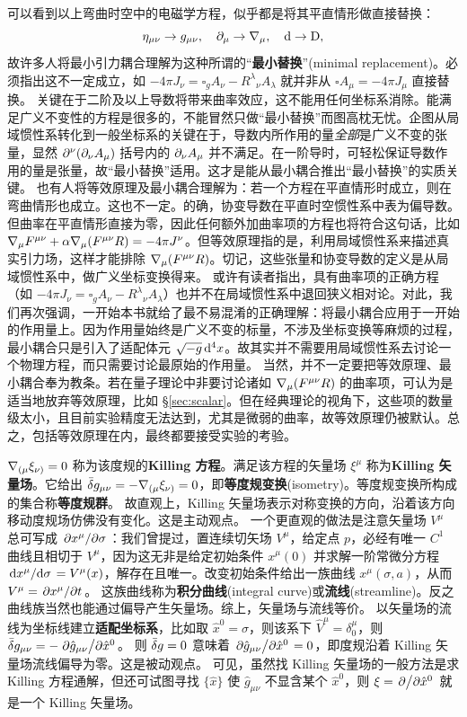 可以看到以上弯曲时空中的电磁学方程，似乎都是将其平直情形做直接替换：
\[
    \eta_{\mu\nu}\to g_{\mu\nu},\quad\p_\mu\to\cd_\mu,\quad\d\to\D,
\]
故许多人将最小引力耦合理解为这种所谓的“\textbf{最小替换}”(minimal replacement)。必须指出这不一定成立，如 $-4\pi J_\nu=\square_g A_\nu- R^\lambda{}_{\nu} A_\lambda$ 就并非从 $\square A_\mu =-4\pi J_\mu$ 直接替换。
关键在于二阶及以上导数将带来曲率效应，这不能用任何坐标系消除。能满足广义不变性的方程是很多的，不能冒然只做“最小替换”而图高枕无忧。企图从局域惯性系转化到一般坐标系的关键在于，导数内所作用的量\textit{全部}是广义不变的张量，显然 $\partial^\nu(\partial_\nu A_\mu)$ 括号内的 $\partial_\nu A_\mu$ 并不满足。在一阶导时，可轻松保证导数作用的量是张量，故“最小替换”适用。这才是能从最小耦合推出“最小替换”的实质关键。
也有人将等效原理及最小耦合理解为：若一个方程在平直情形时成立，则在弯曲情形也成立。这也不一定。的确，协变导数在平直时空惯性系中表为偏导数。但曲率在平直情形直接为零，因此任何额外加曲率项的方程也将符合这句话，比如 $\nabla_\mu F^{\mu\nu}+\alpha \nabla_\mu(F^{\mu\nu}R)=-4 \pi J^\nu$。但等效原理指的是，利用局域惯性系来描述真实引力场，这样才能排除 $\nabla_\mu(F^{\mu\nu}R)$。切记，这些张量和协变导数的定义是从局域惯性系中，做广义坐标变换得来。
或许有读者指出，具有曲率项的正确方程（如 $-4\pi J_\nu=\square_g A_\nu- R^\lambda{}_{\nu} A_\lambda$）也并不在局域惯性系中退回狭义相对论。对此，我们再次强调，一开始本书就给了最不易混淆的正确理解：将最小耦合应用于一开始的作用量上。因为作用量始终是广义不变的标量，不涉及坐标变换等麻烦的过程，最小耦合只是引入了适配体元 $\sqrt{-g}\dd[4]{x}$。故其实并不需要用局域惯性系去讨论一个物理方程，而只需要讨论最原始的作用量。
当然，并不一定要把等效原理、最小耦合奉为教条。若在量子理论中非要讨论诸如 $\nabla_\mu(F^{\mu\nu}R)$ 的曲率项，可认为是适当地放弃等效原理，比如 \S\ref{sec:scalar}。但在经典理论的视角下，这些项的数量级太小，且目前实验精度无法达到，尤其是微弱的曲率，故等效原理仍被默认。总之，包括等效原理在内，最终都要接受实验的考验。

$\nabla_{(\mu}\xi_{\nu)}=0$ 称为该度规的\textbf{Killing 方程}。满足该方程的矢量场 $\xi^\mu$ 称为\textbf{Killing 矢量场}。它给出 $\bar\var g_{\mu\nu}=-\nabla_{(\mu}\xi_{\nu)}=0$，即\textbf{等度规变换}(isometry)。等度规变换所构成的集合称\textbf{等度规群}。
故直观上，Killing 矢量场表示对称变换的方向，沿着该方向移动度规场仿佛没有变化。这是主动观点。
一个更直观的做法是注意矢量场 $V^\mu$ 总可写成 $\pdv*{x^\mu}{\sigma}$：我们曾提过，置连续切矢场 $V^\mu$，给定点 $p$，必经有唯一 $C^1$ 曲线且相切于 $V^\mu$，因为这无非是给定初始条件 $x^\mu(0)$ 并求解一阶常微分方程 $\dv*{x^\mu}{\sigma}=V^\mu(x)$，解存在且唯一。改变初始条件给出一族曲线 $x^\mu(\sigma,a)$，从而 $V^\mu=\pdv*{x^\mu}{t}$。
这族曲线称为\textbf{积分曲线}(integral curve)或\textbf{流线}(streamline)。反之曲线族当然也能通过偏导产生矢量场。综上，矢量场与流线等价。
以矢量场的流线为坐标线建立\textbf{适配坐标系}，比如取 $\hat x^0 = \sigma$，则该系下 $\hat V^\mu=\delta^\mu_0$，则 $\bar\var g_{\mu\nu} = -\pdv*{\hat g_{\mu\nu}}{\hat x^0}$。
则 $\bar\var g=0$ 意味着 $\pdv*{\hat g_{\mu\nu}}{\hat x^0}=0$，即度规沿着 Killing 矢量场流线偏导为零。这是被动观点。
可见，虽然找 Killing 矢量场的一般方法是求 Killing 方程通解，但还可试图寻找 $\{\hat x\}$ 使 $\hat g_{\mu\nu}$ 不显含某个 $\hat x^0$，则 $\xi=\pdv*{\hat x^0}$ 就是一个 Killing 矢量场。

